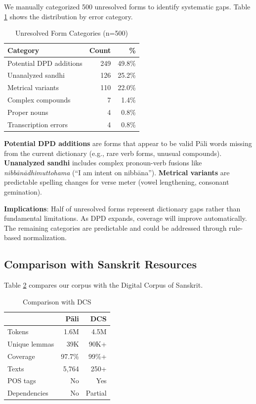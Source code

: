 \documentclass[11pt,twocolumn]{article}
\begin{document}
We manually categorized 500 unresolved forms to identify systematic gaps. Table \ref{tab:errors} shows the distribution by error category.

\begin{table}[ht]
\centering
\caption{Unresolved Form Categories (n=500)}
\label{tab:errors}
\begin{tabular}{lrr}
\toprule
Category & Count & \% \\
\midrule
Potential DPD additions & 249 & 49.8\% \\
Unanalyzed sandhi & 126 & 25.2\% \\
Metrical variants & 110 & 22.0\% \\
Complex compounds & 7 & 1.4\% \\
Proper nouns & 4 & 0.8\% \\
Transcription errors & 4 & 0.8\% \\
\bottomrule
\end{tabular}
\end{table}

\textbf{Potential DPD additions} are forms that appear to be valid Pāli words missing from the current dictionary (e.g., rare verb forms, unusual compounds). \textbf{Unanalyzed sandhi} includes complex pronoun-verb fusions like \emph{nibbānādhimuttohama} (``I am intent on nibbāna''). \textbf{Metrical variants} are predictable spelling changes for verse meter (vowel lengthening, consonant gemination).

\textbf{Implications}: Half of unresolved forms represent dictionary gaps rather than fundamental limitations. As DPD expands, coverage will improve automatically. The remaining categories are predictable and could be addressed through rule-based normalization.

\subsection{Comparison with Sanskrit Resources}

Table \ref{tab:comparison} compares our corpus with the Digital Corpus of Sanskrit.

\begin{table}[ht]
\centering
\caption{Comparison with DCS}
\label{tab:comparison}
\begin{tabular}{lrr}
\toprule
 & Pāli & DCS \\
\midrule
Tokens & 1.6M & 4.5M \\
Unique lemmas & 39K & 90K+ \\
Coverage & 97.7\% & 99\%+ \\
Texts & 5,764 & 250+ \\
POS tags & No & Yes \\
Dependencies & No & Partial \\
\bottomrule
\end{tabular}
\end{table}
\end{document}
